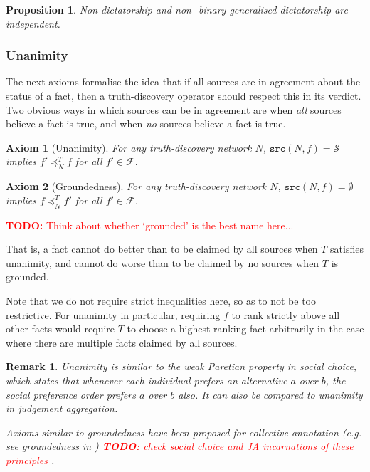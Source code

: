 \documentclass{article}
\theoremstyle{definition} \newtheorem{definition}{Definition}
\theoremstyle{definition} \newtheorem{example}{Example}
\theoremstyle{plain} \newtheorem{axiom}{Axiom}
\theoremstyle{plain} \newtheorem*{remark}{Remark}
\theoremstyle{remark} \newtheorem*{notation}{Notation}
\theoremstyle{plain} \newtheorem{lemma}{Lemma}
\theoremstyle{plain} \newtheorem{theorem}{Theorem}
\theoremstyle{plain} \newtheorem{proposition}{Proposition}
\newcommand{\todo}[1] {
    \textcolor{red}{
        \textbf{TODO:} #1
    }
}
\renewcommand{\S}{\mathcal{S}}  %
\newcommand{\F}{\mathcal{F}}
\newcommand{\fle}{\preceq}
\newcommand{\src}{\texttt{src}}
\begin{document}
\begin{proposition}
\label{prop:non_dict_and_non_bin_gen_dict_indep}
Non-dictatorship and non- binary generalised dictatorship are independent.
\end{proposition}

\subsubsection{Unanimity}

The next axioms formalise the idea that if all sources are in agreement about
the status of a fact, then a truth-discovery operator should respect this in
its verdict. Two obvious ways in which sources can be in agreement are when
\emph{all} sources believe a fact is true, and when \emph{no} sources believe a
fact is true.

\begin{axiom}[Unanimity]
\label{axiom:unanimity}
For any truth-discovery network $N$, $\src(N, f) = \S$ implies $f' \fle_N^T f$
for all $f' \in \F$.
\end{axiom}

\begin{axiom}[Groundedness]
\label{axiom:groundedness}
For any truth-discovery network $N$, $\src(N, f) = \emptyset$ implies $f
\fle_N^T f'$ for all $f' \in \F$.
\end{axiom}

\todo{Think about whether `grounded' is the best name here...}

That is, a fact cannot do better than to be claimed by all sources when $T$
satisfies unanimity, and cannot do worse than to be claimed by no sources when
$T$ is grounded.

Note that we do not require strict inequalities here, so as to not be too
restrictive. For unanimity in particular, requiring $f$ to rank strictly above
all other facts would require $T$ to choose a highest-ranking fact arbitrarily
in the case where there are multiple facts claimed by all sources.

\begin{remark}
Unanimity is similar to the \emph{weak Paretian}
property\cite{create_the_citation...} in social choice, which states that
whenever each individual prefers an alternative $a$ over $b$, the social
preference order prefers $a$ over $b$ also. It can also be compared to
unanimity in judgement aggregation\cite{handbook_ja}.

Axioms similar to groundedness have been proposed for collective annotation
(e.g. see \emph{groundedness} in \cite{kruger}) \todo{check social choice and
JA incarnations of these principles}.
\end{remark}
\end{document}
